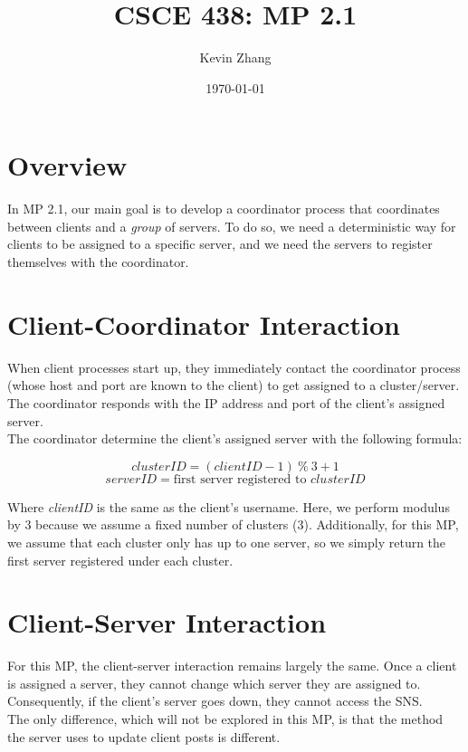 \documentclass{article}
\title{CSCE 438: MP 2.1}
\author{Kevin Zhang}
\date{\today}
\begin{document}
\maketitle

\section{Overview}

In MP 2.1, our main goal is to develop a coordinator process that coordinates between clients and a \textit{group} of servers. To do so, we need a deterministic way for clients to be assigned to a specific server, and we need the servers to register themselves with the coordinator.

\section{Client-Coordinator Interaction}

When client processes start up, they immediately contact the coordinator process (whose host and port are known to the client) to get assigned to a cluster/server. The coordinator responds with the IP address and port of the client's assigned server.\\

\noindent The coordinator determine the client's assigned server with the following formula:

\[ clusterID = (clientID - 1)\ \%\ 3 + 1 \]
\[ serverID = \text{first server registered to } clusterID \]

\noindent Where \textit{clientID} is the same as the client's username. Here, we perform modulus by 3 because we assume a fixed number of clusters (3). Additionally, for this MP, we assume that each cluster only has up to one server, so we simply return the first server registered under each cluster.

\section{Client-Server Interaction}

For this MP, the client-server interaction remains largely the same. Once a client is assigned a server, they cannot change which server they are assigned to. Consequently, if the client's server goes down, they cannot access the SNS.\\

\noindent The only difference, which will not be explored in this MP, is that the method the server uses to update client posts is different.
\end{document}
